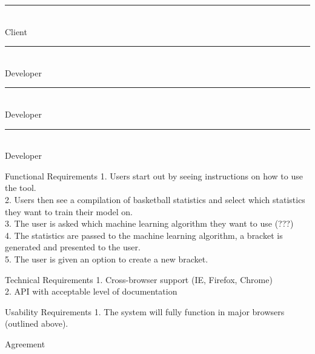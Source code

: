 \documentclass[letterpaper, 10pt,titlepage]{article}
\begin{document}
\newpage
\textbf{ }
\vspace{5.0cm}

\noindent\rule{13cm}{0.4pt}\\
Client
\vspace{3.0cm}

\noindent\rule{13cm}{0.4pt}\\
Developer
\vspace{3.0cm}


\noindent\rule{13cm}{0.4pt}\\
Developer
\vspace{3.0cm}


\noindent\rule{13cm}{0.4pt}\\
Developer
\vspace{3.0cm}


\begin{section}{Functional Requirements}
1.       Users start out by seeing instructions on how to use the tool. \\
2.       Users then see a compilation of basketball statistics and select which statistics they want to train their model on. \\
3.   	The user is asked which machine learning algorithm they want to use (???) \\
4.       The statistics are passed to the machine learning algorithm, a bracket is generated and presented to the user. \\
5.       The user is given an option to create a new bracket. \\


\end{section}

\begin{section}{Technical Requirements}
1.       Cross-browser support (IE, Firefox, Chrome) \\
2.       API with acceptable level of documentation \\


\end{section}

\begin{section}{Usability Requirements}
1.       The system will fully function in major browsers (outlined above). \\


\end{section}





\newpage
\begin{section}{Agreement}
\bigbreak
\bigbreak
\bigbreak

\end{section}
\end{document}
